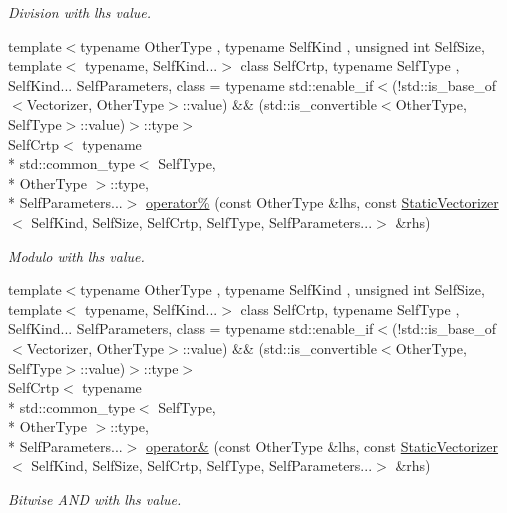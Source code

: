\begin{DoxyCompactItemize}
\begin{DoxyCompactList}\small\item\em Division with lhs value. \end{DoxyCompactList}\item 
{\footnotesize template$<$typename Other\-Type , typename Self\-Kind , unsigned int Self\-Size, template$<$ typename, Self\-Kind...$>$ class Self\-Crtp, typename Self\-Type , Self\-Kind... Self\-Parameters, class  = typename std\-::enable\-\_\-if$<$(!std\-::is\-\_\-base\-\_\-of$<$\-Vectorizer, Other\-Type$>$\-::value) \&\& (std\-::is\-\_\-convertible$<$\-Other\-Type, Self\-Type$>$\-::value)$>$\-::type$>$ }\\Self\-Crtp$<$ typename \\*
std\-::common\-\_\-type$<$ Self\-Type, \\*
Other\-Type $>$\-::type, \\*
Self\-Parameters...$>$ \hyperlink{namespacemagrathea_aa101299f75a0597451ac95a02f5031e1}{operator\%} (const Other\-Type \&lhs, const \hyperlink{classmagrathea_1_1StaticVectorizer}{Static\-Vectorizer}$<$ Self\-Kind, Self\-Size, Self\-Crtp, Self\-Type, Self\-Parameters...$>$ \&rhs)
\begin{DoxyCompactList}\small\item\em Modulo with lhs value. \end{DoxyCompactList}\item 
{\footnotesize template$<$typename Other\-Type , typename Self\-Kind , unsigned int Self\-Size, template$<$ typename, Self\-Kind...$>$ class Self\-Crtp, typename Self\-Type , Self\-Kind... Self\-Parameters, class  = typename std\-::enable\-\_\-if$<$(!std\-::is\-\_\-base\-\_\-of$<$\-Vectorizer, Other\-Type$>$\-::value) \&\& (std\-::is\-\_\-convertible$<$\-Other\-Type, Self\-Type$>$\-::value)$>$\-::type$>$ }\\Self\-Crtp$<$ typename \\*
std\-::common\-\_\-type$<$ Self\-Type, \\*
Other\-Type $>$\-::type, \\*
Self\-Parameters...$>$ \hyperlink{namespacemagrathea_a4fd24aa869c1cae4d82bea7d72e79381}{operator\&} (const Other\-Type \&lhs, const \hyperlink{classmagrathea_1_1StaticVectorizer}{Static\-Vectorizer}$<$ Self\-Kind, Self\-Size, Self\-Crtp, Self\-Type, Self\-Parameters...$>$ \&rhs)
\begin{DoxyCompactList}\small\item\em Bitwise A\-N\-D with lhs value. \end{DoxyCompactList}\item 

\end{DoxyCompactItemize}

